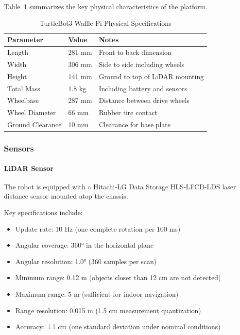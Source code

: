 \documentclass[11pt]{article}
\begin{document}
Table~\ref{tab:robot_specs} summarizes the key physical characteristics of the platform.

\begin{table}[h]
	\centering
	\caption{TurtleBot3 Waffle Pi Physical Specifications}
	\label{tab:robot_specs}
	\begin{tabular}{|l|l|p{6cm}|}
		\hline
		\textbf{Parameter} & \textbf{Value} & \textbf{Notes} \\ \hline
		Length & 281 mm & Front to back dimension \\ \hline
		Width & 306 mm & Side to side including wheels \\ \hline
		Height & 141 mm & Ground to top of LiDAR mounting \\ \hline
		Total Mass & 1.8 kg & Including battery and sensors \\ \hline
		Wheelbase & 287 mm & Distance between drive wheels \\ \hline
		Wheel Diameter & 66 mm & Rubber tire contact \\ \hline
		Ground Clearance & 10 mm & Clearance for base plate \\ \hline
	\end{tabular}
\end{table}

\subsubsection{Sensors}

\paragraph{LiDAR Sensor}

The robot is equipped with a Hitachi-LG Data Storage HLS-LFCD-LDS laser distance sensor mounted atop the chassis.

Key specifications include:
\begin{itemize}
	\item Update rate: 10 Hz (one complete rotation per 100 ms)
	\item Angular coverage: 360° in the horizontal plane
	\item Angular resolution: 1.0° (360 samples per scan)
	\item Minimum range: 0.12 m (objects closer than 12 cm are not detected)
	\item Maximum range: 5 m (sufficient for indoor navigation)
	\item Range resolution: 0.015 m (1.5 cm measurement quantization)
	\item Accuracy: ±1 cm (one standard deviation under nominal conditions)
\end{itemize}
\end{document}
